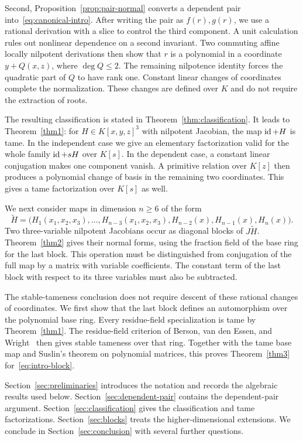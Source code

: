 Second, Proposition~\ref{prop:pair-normal} converts a dependent pair into~\eqref{eq:canonical-intro}. After writing the pair as $f(r),g(r)$, we use a rational derivation with a slice to control the third component. A unit calculation rules out nonlinear dependence on a second invariant. Two commuting affine locally nilpotent derivations then show that $r$ is a polynomial in a coordinate $y+Q(x,z)$, where $\deg Q\leq2$. The remaining nilpotence identity forces the quadratic part of $Q$ to have rank one. Constant linear changes of coordinates complete the normalization. These changes are defined over $K$ and do not require the extraction of roots.

The resulting classification is stated in Theorem~\ref{thm:classification}. It leads to Theorem~\ref{thm1}: for $H\in K[x,y,z]^3$ with nilpotent Jacobian, the map $\operatorname{id}+H$ is tame. In the independent case we give an elementary factorization valid for the whole family $\operatorname{id}+sH$ over $K[s]$. In the dependent case, a constant linear conjugation makes one component vanish. A primitive relation over $K[z]$ then produces a polynomial change of basis in the remaining two coordinates. This gives a tame factorization over $K[s]$ as well.

We next consider maps in dimension $n\geq6$ of the form
\begin{equation}\label{eq:intro-block}
 \widetilde H=\bigl(H_1(x_1,x_2,x_3),\ldots,H_{n-3}(x_1,x_2,x_3),
 H_{n-2}(x),H_{n-1}(x),H_n(x)\bigr).
\end{equation}
Two three-variable nilpotent Jacobians occur as diagonal blocks of $J\widetilde H$. Theorem~\ref{thm2} gives their normal forms, using the fraction field of the base ring for the last block. This operation must be distinguished from conjugation of the full map by a matrix with variable coefficients. The constant term of the last block with respect to its three variables must also be subtracted.

The stable-tameness conclusion does not require descent of these rational changes of coordinates. We first show that the last block defines an automorphism over the polynomial base ring. Every residue-field specialization is tame by Theorem~\ref{thm1}. The residue-field criterion of Berson, van den Essen, and Wright~\cite[Theorem~4.12]{BEW} then gives stable tameness over that ring. Together with the tame base map and Suslin's theorem on polynomial matrices, this proves Theorem~\ref{thm3} for~\eqref{eq:intro-block}.

Section~\ref{sec:preliminaries} introduces the notation and records the algebraic results used below. Section~\ref{sec:dependent-pair} contains the dependent-pair argument. Section~\ref{sec:classification} gives the classification and tame factorizations. Section~\ref{sec:blocks} treats the higher-dimensional extensions. We conclude in Section~\ref{sec:conclusion} with several further questions.
